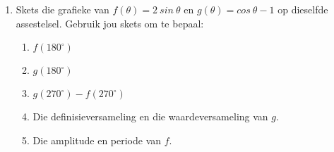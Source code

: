 \begin{eocexercises}{}
\begin{enumerate}[noitemsep, label=\textbf{\arabic*}. ]
  \item Skets die grafieke van $f(\theta)=2~ sin~\theta$ en $g(\theta)=cos~\theta-1$ op dieselfde assestelsel. Gebruik jou skets om te bepaal:
    \begin{enumerate}[noitemsep, label=\textbf{(\alph*)} ]
    \item $f(180^{\circ})$
    \item $g(180^{\circ})$
    \item $g(270^{\circ}) -f(270^{\circ})$
    \item Die definisieversameling en die waardeversameling van $g$.
    \item Die amplitude en periode van $f$.
    \end{enumerate}
  \end{enumerate}


\end{eocexercises}
